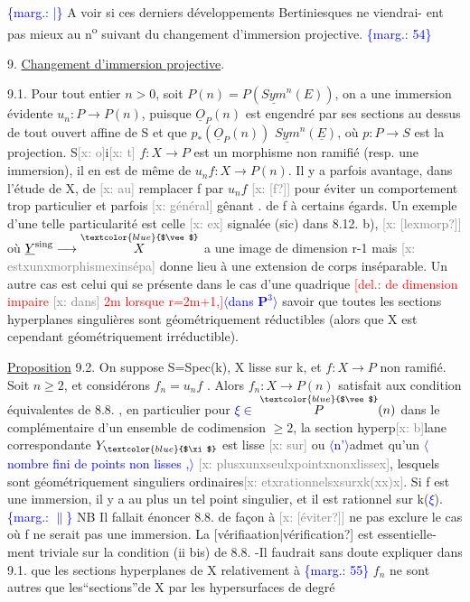 \documentclass[11pt]{article}
\newcommand{\scanpage}[1]{\par\bigskip\noindent{\small\sffamily[scan #1]}\par}
\newcommand{\mspage}[1]{{\small\sffamily[p.\,#1]}}
\newcommand{\hand}[1]{\textcolor{blue}{#1}}
\newcommand{\inserted}[2][]{\textcolor{blue}{$\langle$#2$\rangle$}}
\newcommand{\margin}[1]{\textcolor{blue}{\{\textsf{marg.:} #1\}}}
\newcommand{\deleted}[1]{\textcolor{red}{[\textsf{del.:} #1]}}
\newcommand{\xout}[1]{\textcolor{gray}{[\textsf{x:} #1]}}
\newcommand{\uline}[1]{\underline{#1}}
\newcommand{\unsure}[1]{[#1?]}
\begin{document}
\margin{|} A voir si ces derniers développements Bertiniesques ne viendrai-%
ent pas mieux au n\textsuperscript{o} suivant du changement d'immersion projective. \margin{54}

\clearpage
\scanpage{25/55}
\mspage{50}

9. \uline{Changement d'immersion projective}.

9.1. Pour tout entier $n > 0$, soit $P(n) = P(\underline{Sym}^n(E))$, on a une
immersion évidente $u_n\colon P \to P(n)$, puisque $\underline{O}_P(n)$ est engendré par
ses sections au dessus de tout ouvert affine de S et que $p_*(\underline{O}_P(n))$
$\underline{Sym}^n(\underline{E})$, où $p\colon P \to S$ est la projection. S\xout{o}i\xout{t} $f\colon X\to P$ est un morphisme
non ramifié (resp. une immersion), il en est de même de $u_n f\colon X \to P(n)$.
Il y a parfois avantage, dans l'étude de X, de \xout{au} remplacer f par $u_n f$ \xout{\unsure{f}}
pour éviter un comportement trop particulier et parfois \xout{général} gênant .
de f à certains égards. Un exemple d'une telle particularité est celle
\xout{ex} signalée (sic) dans 8.12. b), \xout{\unsure{lexmorp}} où $\underline{Y}^{\mathrm{sing}} \longrightarrow \overset{\hand{$\vee$}}{X}$ a une image de
dimension r-1 mais \xout{estxunxmorphismexinsépa} donne lieu à une extension
de corps inséparable. Un autre cas est celui qui se présente dans le cas
d'une quadrique \deleted{de dimension impaire \xout{dans} 2m lorsque r=2m+1,}\inserted{dans $\mathbf{P}^3$} savoir que
toutes les sections hyperplanes singulières sont géométriquement
réductibles (alors que X est cependant géométriquement irréductible).

\uline{Proposition} 9.2. On suppose S=Spec(k), X lisse sur k, et $f\colon X\to P$ non
ramifié. Soit $n \geq 2$, et considérons $f_n = u_n f$ . Alors $f_n : X \to P(n)$
satisfait aux condition équivalentes de 8.8. , en particulier
pour \hand{$\xi \in$} $\overset{\hand{$\vee$}}{P}(n)$ dans le complémentaire d'un ensemble de codimension $\geq 2$,
la section hyperp\xout{b}lane correspondante $Y_{\hand{$\xi$}}$ est lisse \xout{sur} ou \inserted{n'}admet qu'un
\inserted[typed]{nombre fini de points non lisses ,}
\xout{plusxunxseulxpointxnonxlissex}, lesquels sont géométriquement singuliers
ordinaires\xout{etxrationnelsxsurxk(xx)x}. Si f est une immersion, il y a au
plus un tel point singulier, et il est rationnel sur k(\hand{$\xi$}).
\margin{$\|$} NB Il fallait énoncer 8.8. de façon à \xout{\unsure{éviter}} ne pas exclure le
cas où f ne serait pas une immersion. La \unsure{vérifiaation|vérification} est essentielle-%
ment triviale sur la condition (ii bis) de 8.8. -Il faudrait sans doute
expliquer dans 9.1. que les sections hyperplanes de X relativement à
\margin{55} $f_n$ ne sont autres que les``sections''de X par les hypersurfaces de degré
\end{document}
